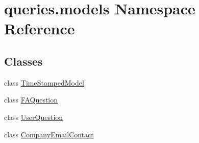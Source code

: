 \hypertarget{namespacequeries_1_1models}{\section{queries.\-models Namespace Reference}
\label{namespacequeries_1_1models}
}
\subsection*{Classes}
\begin{DoxyCompactItemize}
\item 
class \hyperlink{classqueries_1_1models_1_1_time_stamped_model}{Time\-Stamped\-Model}
\item 
class \hyperlink{classqueries_1_1models_1_1_f_a_question}{F\-A\-Question}
\item 
class \hyperlink{classqueries_1_1models_1_1_user_question}{User\-Question}
\item 
class \hyperlink{classqueries_1_1models_1_1_company_email_contact}{Company\-Email\-Contact}
\end{DoxyCompactItemize}
